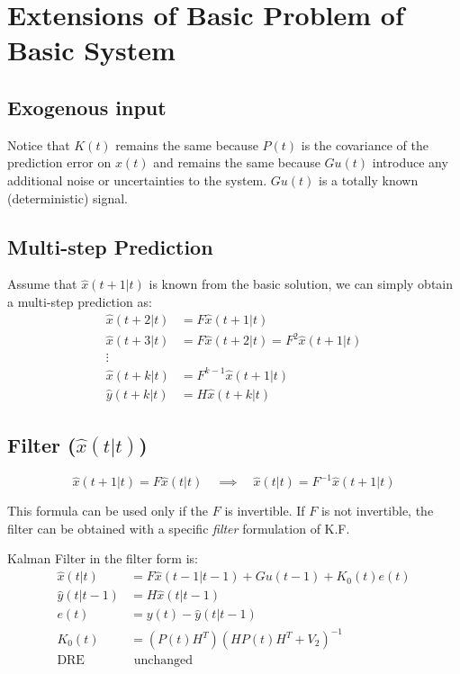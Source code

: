 \section{Extensions of Basic Problem of Basic System}

\subsection{Exogenous input}

Notice that $K(t)$ remains the same because $P(t)$ is the covariance of the prediction error on $x(t)$ and remains the same because $Gu(t)$ introduce any additional noise or uncertainties to the system.
$Gu(t)$ is a totally known (deterministic) signal.

\subsection{Multi-step Prediction}

Assume that $\hat{x}(t+1|t)$ is known from the basic solution, we can simply obtain a multi-step prediction as:
\begin{align*}
    \hat{x}(t+2|t) &= F \hat{x}(t+1|t) \\
    \hat{x}(t+3|t) &= F \hat{x}(t+2|t) = F^2\hat{x}(t+1|t) \\
    \vdots \\
    \hat{x}(t+k|t) &= F^{k-1} \hat{x}(t+1|t) \\
    \hat{y}(t+k|t) &= H\hat{x}(t+k|t)
\end{align*}

\subsection{Filter ($\hat{x}(t|t)$)}

\[
    \hat{x}(t+1|t) = F\hat{x}(t|t) \quad \implies \quad \hat{x}(t|t) = F^{-1}\hat{x}(t+1|t)
\]

This formula can be used only if the $F$ is invertible.
If $F$ is not invertible, the filter can be obtained with a specific \emph{filter} formulation of K.F.

Kalman Filter in the filter form is:
\begin{align*}
    \hat{x}(t|t) &= F\hat{x}(t-1|t-1) + Gu(t-1) + K_0(t)e(t) \\
    \hat{y}(t|t-1) &= H\hat{x}(t|t-1) \\
    e(t) &= y(t) - \hat{y}(t|t-1) \\
    K_0(t) &= \left(P(t)H^T\right) \left(HP(t)H^T+V_2\right)^{-1} \\
    \text{DRE}& \text{ unchanged}
\end{align*}

